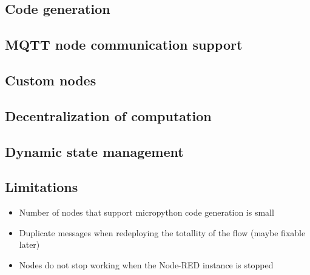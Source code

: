\subsection{Code generation}

\subsection{MQTT node communication support}

\subsection{Custom nodes}

\subsection{Decentralization of computation}

\subsection{Dynamic state management}

\subsection{Limitations}

\begin{itemize}
    \item Number of nodes that support micropython code generation is small
    \item Duplicate messages when redeploying the totallity of the flow (maybe fixable later)
    \item Nodes do not stop working when the Node-RED instance is stopped
\end{itemize}
